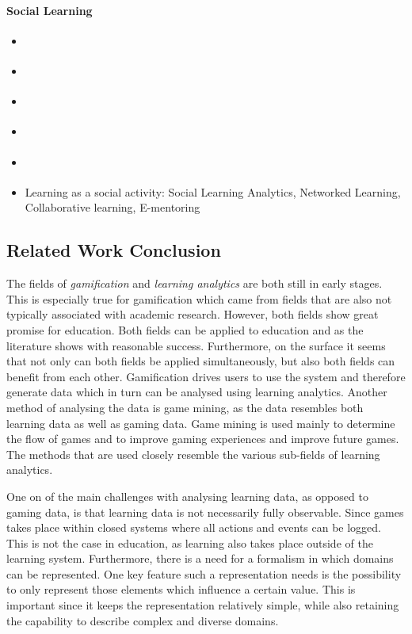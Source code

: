 \documentclass[11pt]{article}
\begin{document}
\paragraph{Social Learning}
\begin{itemize}
  \item \cite{Shum2012}
  \item \cite{Ullmann2011}
  \item \cite{Haiming2012}
  \item \cite{Fournier2011}
  \item \cite{Ferguson2012b}
  \item Learning as a social activity: Social Learning Analytics, Networked Learning, Collaborative learning, E-mentoring
\end{itemize}

\subsection{Related Work Conclusion}
The fields of \emph{gamification} and \emph{learning analytics} are both still in early stages. This is especially true for gamification which came from fields that are also not typically associated with academic research. However, both fields show great promise for education. Both fields can be applied to education and as the literature shows with reasonable success. Furthermore, on the surface it seems that not only can both fields be applied simultaneously, but also both fields can benefit from each other. Gamification drives users to use the system and therefore generate data which in turn can be analysed using learning analytics. Another method of analysing the data is game mining, as the data resembles both learning data as well as gaming data. Game mining is used mainly to determine the flow of games and to improve gaming experiences and improve future games. The methods that are used closely resemble the various sub-fields of learning analytics. 

One on of the main challenges with analysing learning data, as opposed to gaming data, is that learning data is not necessarily fully observable. Since games takes place within closed systems where all actions and events can be logged. This is not the case in education, as learning also takes place outside of the learning system. Furthermore, there is a need for a formalism in which domains can be represented. One key feature such a representation needs is the possibility to only represent those elements which influence a certain value. This is important since it keeps the representation relatively simple, while also retaining the capability to describe complex and diverse domains. 
\end{document}
